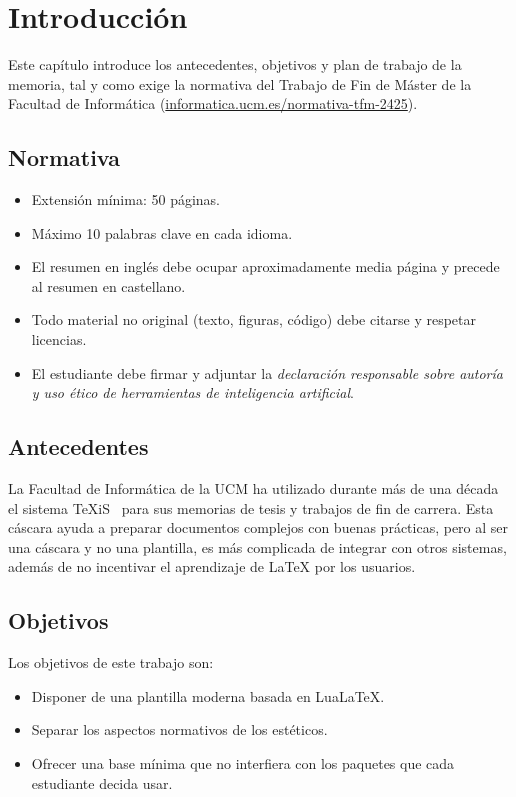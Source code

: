 \chapter{Introducción}

Este capítulo introduce los antecedentes, objetivos y plan de
trabajo de la memoria, tal y como exige la normativa del Trabajo
de Fin de Máster de la Facultad de Informática
(\href{https://informatica.ucm.es/normativa-tfm-2425}{informatica.ucm.es/normativa-tfm-2425}).

\section{Normativa}

\begin{itemize}\setlength{\itemsep}{0pt}
  \item Extensión mínima: 50 páginas.
  \item Máximo 10 palabras clave en cada idioma.
  \item El resumen en inglés debe ocupar aproximadamente media
        página y precede al resumen en castellano.
  \item Todo material no original (texto, figuras, código) debe
        citarse y respetar licencias.
  \item El estudiante debe firmar y adjuntar la \emph{declaración
        responsable sobre autoría y uso ético de herramientas de
        inteligencia artificial}.
\end{itemize}

\section{Antecedentes}

La Facultad de Informática de la UCM ha utilizado durante más de
una década el sistema TeXiS~\cite{texis} para sus memorias de
tesis y trabajos de fin de carrera. Esta cáscara ayuda a preparar
documentos complejos con buenas prácticas, pero al ser una
cáscara y no una plantilla, es más complicada de integrar con
otros sistemas, además de no incentivar el aprendizaje de LaTeX
por los usuarios.

\section{Objetivos}

Los objetivos de este trabajo son:
\begin{itemize}
  \item Disponer de una plantilla moderna basada en LuaLaTeX.
  \item Separar los aspectos normativos de los estéticos.
  \item Ofrecer una base mínima que no interfiera con los
        paquetes que cada estudiante decida usar.
\end{itemize}
